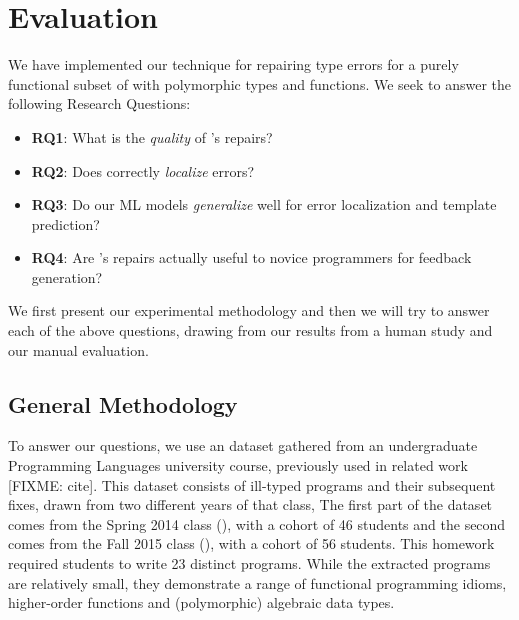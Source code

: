 \section{Evaluation}
\label{sec:eval}

We have implemented our technique for repairing type errors for a purely
functional subset of \ocaml with polymorphic types and functions. We seek to
answer the following Research Questions:

\begin{itemize}
    \item \textbf{RQ1}: What is the \emph{quality} of \toolname's repairs?
    \item \textbf{RQ2}: Does \toolname correctly \emph{localize} errors?
    \item \textbf{RQ3}: Do our ML models \emph{generalize} well for error
    localization and template prediction?
    \item \textbf{RQ4}: Are \toolname's repairs actually useful to novice programmers
    for feedback generation?
\end{itemize}

We first present our experimental methodology and then we will try to answer
each of the above questions, drawing from our results from a human study and our
manual evaluation.


\subsection{General Methodology}
\label{subsec:gen_method}
To answer our questions, we use an \ocaml dataset gathered from an
undergraduate Programming Languages university course, previously
used in related work [FIXME: cite]. This dataset consists of ill-typed programs
and their subsequent fixes, drawn from two different years of that class, The
first part of the dataset comes from the Spring 2014 class (\SPRING), with a
cohort of 46 students and the second comes from the Fall 2015 class (\FALL),
with a cohort of 56 students. This homework required students to write 23
distinct programs. While the extracted programs are relatively
small, they demonstrate a range of functional programming idioms, \eg
higher-order functions and (polymorphic) algebraic data types.

